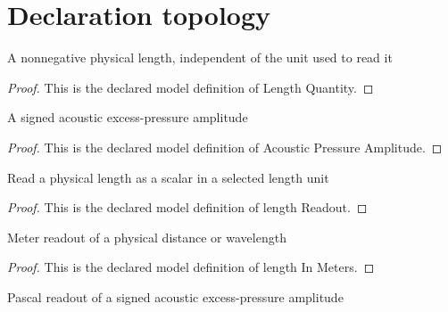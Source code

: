 \section{Declaration topology}
\begin{definition}
  \label{def:physics:phyx-mini-0192:phyxminiproblems-problemphyxmini0192-lengthquantity}
  A nonnegative physical length, independent of the unit used to read it
\end{definition}
\begin{proof}
  This is the declared model definition of Length Quantity.
\end{proof}
\begin{definition}
  \label{def:physics:phyx-mini-0192:phyxminiproblems-problemphyxmini0192-acousticpressureamplitude}
  A signed acoustic excess-pressure amplitude
\end{definition}
\begin{proof}
  This is the declared model definition of Acoustic Pressure Amplitude.
\end{proof}
\begin{definition}
  \label{def:physics:phyx-mini-0192:phyxminiproblems-problemphyxmini0192-lengthreadout}
  Read a physical length as a scalar in a selected length unit
\end{definition}
\begin{proof}
  This is the declared model definition of length Readout.
\end{proof}
\begin{definition}
  \label{def:physics:phyx-mini-0192:phyxminiproblems-problemphyxmini0192-lengthinmeters}
  Meter readout of a physical distance or wavelength
\end{definition}
\begin{proof}
  This is the declared model definition of length In Meters.
\end{proof}
\begin{definition}
  \label{def:physics:phyx-mini-0192:phyxminiproblems-problemphyxmini0192-pressureamplitudeinpascals}
  Pascal readout of a signed acoustic excess-pressure amplitude
\end{definition}
